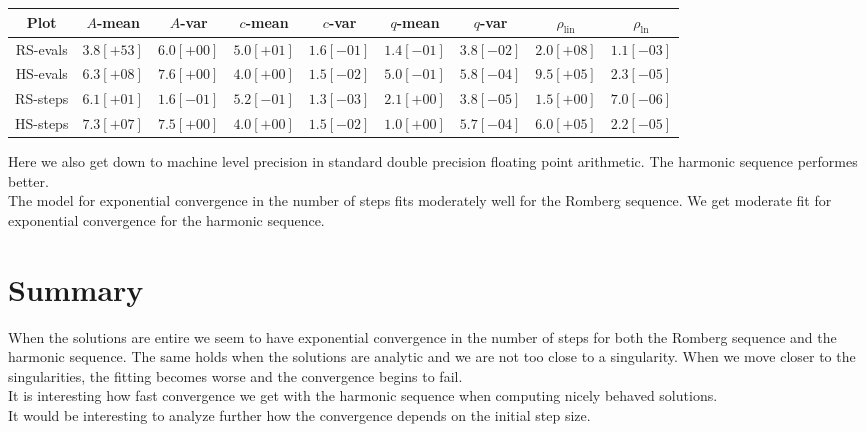 \begin{table}[H]
    \centering
    \small
    \begin{tabular}{c||c|c|c|c|c|c|c|c}
Plot & \(A\)-mean & \(A\)-var & \(c\)-mean & \(c\)-var & \(q\)-mean & \(q\)-var & \(\rho_{\operatorname{lin}}\) & \(\rho_{\ln}\)\\\hline
\rowcolor{red}
RS-evals & \(3.8[+53]\) & \(6.0[+00]\) & \(5.0[+01]\) & \(1.6[-01]\) & \(1.4[-01]\) & \(3.8[-02]\) & \(2.0[+08]\) & \(1.1[-03]\) \\
\rowcolor{green}
HS-evals & \(6.3[+08]\) & \(7.6[+00]\) & \(4.0[+00]\) & \(1.5[-02]\) & \(5.0[-01]\) & \(5.8[-04]\) & \(9.5[+05]\) & \(2.3[-05]\) \\
\rowcolor{green}
RS-steps & \(6.1[+01]\) & \(1.6[-01]\) & \(5.2[-01]\) & \(1.3[-03]\) & \(2.1[+00]\) & \(3.8[-05]\) & \(1.5[+00]\) & \(7.0[-06]\) \\
\rowcolor{green}
HS-steps & \(7.3[+07]\) & \(7.5[+00]\) & \(4.0[+00]\) & \(1.5[-02]\) & \(1.0[+00]\) & \(5.7[-04]\) & \(6.0[+05]\) & \(2.2[-05]\) \\
    \end{tabular}
    \label{tab:my_label}
\end{table}

Here we also get down to machine level precision in standard double precision floating point arithmetic. The harmonic sequence performes better.\\

The model for exponential convergence in the number of steps fits moderately well for the Romberg sequence. We get moderate fit for exponential convergence for the harmonic sequence.

\section{Summary}

When the solutions are entire we seem to have exponential convergence in the number of steps for both the Romberg sequence and the harmonic sequence. The same holds when the solutions are analytic and we are not too close to a singularity. When we move closer to the singularities, the fitting becomes worse and the convergence begins to fail.\\

It is interesting how fast convergence we get with the harmonic sequence when computing nicely behaved solutions.\\

It would be interesting to analyze further how the convergence depends on the initial step size.\\